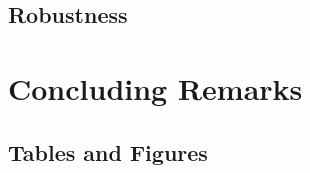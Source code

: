 \documentclass[10pt]{article}
\theoremstyle{definition}
\theoremstyle{remark}
\begin{document}
\subsection{Robustness}\label{subsec:robust}


\section{Concluding Remarks}\label{sec:conc}


\newpage


\newpage
\begin{appendices}

\section{Tables and Figures}


\end{appendices}
\end{document}
